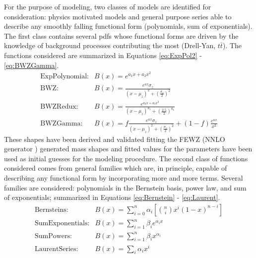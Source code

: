 For the purpose of modeling, two classes of models are identified for consideration: physics motivated models and general purpose series able to describe any smoothly falling functional form (polynomials, sum of exponentials). The first class contains several pdfs whose functional forms are driven by the knowledge of background processes contributing the most (Drell-Yan, $t\bar{t}$). The functions considered are summarized in Equations \ref{eq:ExpPol2} - \ref{eq:BWZGamma}.
\begin{align}
        \label{eq:ExpPol2}
        \text{ExpPolynomial:}& {B(x)} = {e^{a_{1}x + a_{2}x^2}} \\
        \label{eq:BWZ}
        \text{BWZ:}& {B(x)} = {\frac{e^{ax}\sigma_{z}}{(x-\mu_{z})^2 + (\frac{\sigma_{z}}{2})^2}} \\
        \label{eq:BWZRedux}
        \text{BWZRedux:}& {B(x)} = {\frac{e^{a_{2}x + a_{3}x^2}}{(x-\mu_{z})^{a_{1}} + (\frac{2.5}{2})^{a_{1}}}} \\
        \label{eq:BWZGamma}
        \text{BWZGamma:}& {B(x)} = {f\frac{e^{ax}\sigma_{z}}{(x-\mu_{z})^2 + (\frac{\sigma_{z}}{2})^2} + (1-f)\frac{e^{ax}}{x^2}}
\end{align}
These shapes have been derived and validated fitting the FEWZ (NNLO generator \cite{Gavin:2010az}) generated mass shapes and fitted values for the parameters have been used as initial guesses for the modeling procedure. The second class of functions considered comes from general families which are, in principle, capable of describing any functional form by incorporating more and more terms. Several families are considered: polynomials in the Bernstein basis, power law, and sum of exponentials; summarized in Equations \ref{eq:Bernstein} - \ref{eq:Laurent}.
\begin{align}
        \label{eq:Bernstein}
        \text{Bernsteins:}& {B(x)} = {\sum_{i=0}^{n} \alpha_i[\binom{n}{i}x^{i}(1-x)^{n-i}]} \\
        \label{eq:SumExponentials}
        \text{SumExponentials:}& {B(x)} = {\sum_{i=1}^{n} \beta_{i}e^{\alpha_{i}x}}\\
        \label{eq:SumPowers}
        \text{SumPowers:}& {B(x)} = {\sum_{i=1}^{n} \beta_{i}x^{\alpha_{i}}}\\
        \label{eq:Laurent}
        \text{LaurentSeries:}& {B(x)} = {\sum_{i} \alpha_{i}x^{i}}
\end{align}

